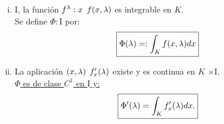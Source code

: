 \begin{enumerate}[(i)]
\item \todo \phantom{} \lam \en $\mathrm{I}$, la función $f^{\lambda}:x$ \flecha $f(x,\lambda)$ es integrable en $K$. \\
Se define $\Phi:\mathrm{I}$ \flecha \F \phantom{} por: \\
\begin{equation*}
\boxed{\Phi(\lambda)=:\int_K f(x,\lambda)dx}
\end{equation*}

\item La aplicación $(x,\lambda)$ \flecha $f'_x (\lambda)$ existe y es continua en $K$ $\times \mathrm{I}$. \\
\underline{$\Phi$ es de clase $C^1$ en $\mathrm{I}$ y:}\\

\begin{equation*}
\boxed{\Phi ' (\lambda)=\int_K f'_x(\lambda) dx.}
\end{equation*}
\end{enumerate}

